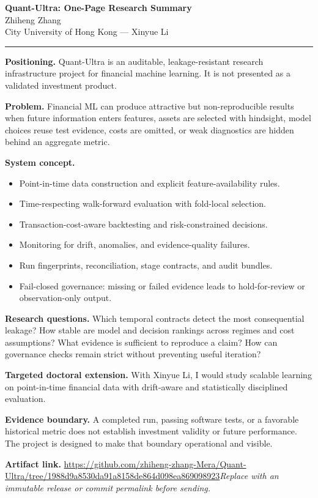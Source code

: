 \documentclass[11pt]{article}
\newcommand{\ApplicantName}{Zhiheng Zhang}
\newcommand{\ApplicantGitHub}{\url{https://github.com/zhiheng-zhang-Mera/Quant-Ultra/tree/1988d9a8530da91a8158de864d098ea869098923}}
\begin{document}
\begin{center}
{\LARGE\bfseries Quant-Ultra: One-Page Research Summary}\\[0.25em]
{\large \ApplicantName}\\
City University of Hong Kong --- Xinyue Li
\end{center}
\vspace{0.35em}\hrule\vspace{0.65em}

\textbf{Positioning.} Quant-Ultra is an auditable, leakage-resistant research infrastructure project for financial machine learning. It is not presented as a validated investment product.

\textbf{Problem.} Financial ML can produce attractive but non-reproducible results when future information enters features, assets are selected with hindsight, model choices reuse test evidence, costs are omitted, or weak diagnostics are hidden behind an aggregate metric.

\textbf{System concept.}
\begin{itemize}
\item Point-in-time data construction and explicit feature-availability rules.
\item Time-respecting walk-forward evaluation with fold-local selection.
\item Transaction-cost-aware backtesting and risk-constrained decisions.
\item Monitoring for drift, anomalies, and evidence-quality failures.
\item Run fingerprints, reconciliation, stage contracts, and audit bundles.
\item Fail-closed governance: missing or failed evidence leads to hold-for-review or observation-only output.
\end{itemize}

\textbf{Research questions.} Which temporal contracts detect the most consequential leakage? How stable are model and decision rankings across regimes and cost assumptions? What evidence is sufficient to reproduce a claim? How can governance checks remain strict without preventing useful iteration?

\textbf{Targeted doctoral extension.} With Xinyue Li, I would study scalable learning on point-in-time financial data with drift-aware and statistically disciplined evaluation.

\textbf{Evidence boundary.} A completed run, passing software tests, or a favorable historical metric does not establish investment validity or future performance. The project is designed to make that boundary operational and visible.

\textbf{Artifact link.} \ApplicantGitHub\quad \textit{Replace with an immutable release or commit permalink before sending.}
\end{document}
